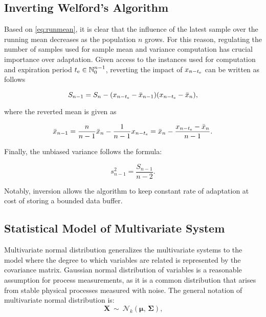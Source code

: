 \subsection{Inverting Welford's Algorithm}\label{AA:InvWelford}
Based on \eqref{eq:runmean}, it is clear that the influence of the latest sample over the running mean decreases as the population \(n\) grows. For this reason, regulating the number of samples used for sample mean and variance computation has crucial importance over adaptation. Given access to the instances used for computation and expiration period \(t _{\text{e}} \in \mathbb{N}_{0}^{n-1}\), reverting the impact of \(x_{n-t _{\text{e}}}\) can be written as follows

\begin{equation}
S_{n-1} = S_n - (x_{n-t _{\text{e}}} - \bar x_{n-1})(x_{n-t _{\text{e}}} - \bar x_n)\text{,}\label{eq:revrunmean}
\end{equation}

where the reverted mean is given as

\begin{equation}
\bar x_{n-1} = \frac{n}{n-1} \bar x_{n} - \frac{1}{n-1}x_{n-t _{\text{e}}} = \bar x_{n} - \frac{x_{n-t _{\text{e}}} - \bar x_{n}}{n-1}\text{.}\label{eq:revmean}
\end{equation}


Finally, the unbiased variance follows the formula:

\begin{equation}
s^2_{n-1} = \frac{S_{n-1}}{n-2}\text{.}\label{eq:revvar}
\end{equation}

Notably, inversion allows the algorithm to keep constant rate of adaptation at cost of storing a bounded data buffer.

\subsection{Statistical Model of Multivariate System}\label{AA:Distribution}
Multivariate normal distribution generalizes the multivariate systems to the model where the degree to which variables are related is represented by the covariance matrix. Gaussian normal distribution of variables is a reasonable assumption for process measurements, as it is a common distribution that arises from stable physical processes measured with noise. The general notation of multivariate normal distribution is:
\begin{equation}
 \mathbf{X}\ \sim\ \mathcal{N}_k(\boldsymbol\mu,\, \boldsymbol\Sigma)\text{,}\label{eq:distribution}
\end{equation}

